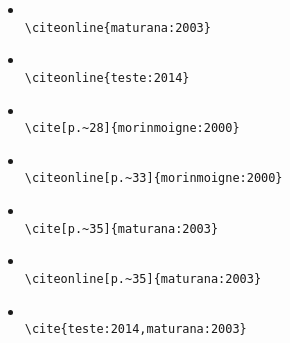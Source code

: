 \begin{itemize}
	\item {}\\ \verb|\citeonline{maturana:2003}|
	\item {}\\ \verb|\citeonline{teste:2014}|
	\item \cite[p.~28]{morinmoigne:2000}\\ \verb|\cite[p.~28]{morinmoigne:2000}|
	\item {}\\ \verb|\citeonline[p.~33]{morinmoigne:2000}|
	\item \cite[p.~35]{maturana:2003}\\ \verb|\cite[p.~35]{maturana:2003}|
	\item {}\\ \verb|\citeonline[p.~35]{maturana:2003}|
	\item \cite{teste:2014,maturana:2003}\\ \verb|\cite{teste:2014,maturana:2003}|
\end{itemize}
